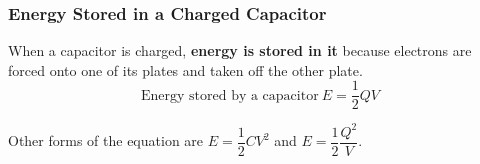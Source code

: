 \subsubsection{Energy Stored in a Charged Capacitor}

When a capacitor is charged, \textbf{energy is stored in it} because electrons are forced onto one of its plates and taken off the other plate.
$$\text{Energy stored by a capacitor}\ E=\frac{1}{2}QV$$

Other forms of the equation are $E=\dfrac{1}{2}CV^2$ and $E=\dfrac{1}{2}\dfrac{Q^2}{V}$.
